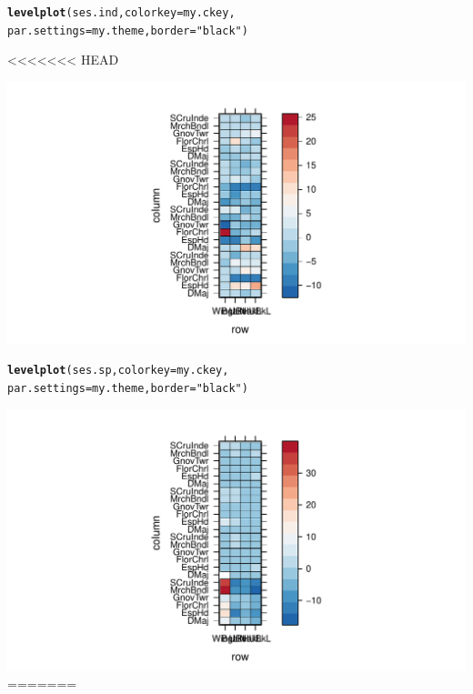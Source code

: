 \documentclass[12pt]{article}\usepackage[]{graphicx}\usepackage[]{color}
\makeatletter
\def\maxwidth{ %
  \ifdim\Gin@nat@width>\linewidth
    \linewidth
  \else
    \Gin@nat@width
  \fi
}
\newcommand{\hlstr}[1]{\textcolor[rgb]{0.192,0.494,0.8}{#1}}%
\newcommand{\hlstd}[1]{\textcolor[rgb]{0.345,0.345,0.345}{#1}}%
\newcommand{\hlkwc}[1]{\textcolor[rgb]{0.333,0.667,0.333}{#1}}%
\newcommand{\hlkwd}[1]{\textcolor[rgb]{0.737,0.353,0.396}{\textbf{#1}}}%
\newenvironment{kframe}{%
 \def\at@end@of@kframe{}%
 \ifinner\ifhmode%
  \def\at@end@of@kframe{\end{minipage}}%
  \begin{minipage}{\columnwidth}%
 \fi\fi%
 \def\FrameCommand##1{\hskip\@totalleftmargin \hskip-\fboxsep
 \colorbox{shadecolor}{##1}\hskip-\fboxsep
     \hskip-\linewidth \hskip-\@totalleftmargin \hskip\columnwidth}%
 \MakeFramed {\advance\hsize-\width
   \@totalleftmargin\z@ \linewidth\hsize
   \@setminipage}}%
 {\par\unskip\endMakeFramed%
 \at@end@of@kframe}
\newenvironment{knitrout}{}{} %
\makeatother
\begin{document}
\begin{knitrout}
\begin{kframe}
{\ttfamily\noindent\bfseries\color{errorcolor}{\#\# Error: erreur d'évaluation de l'argument 'x' lors de la sélection d'une méthode pour la fonction 't' : Erreur dans rbind(ses.list[[5]]\$ses, ses.list[[6]]\$ses, ses.list[[7]]\$ses,\ \ : \\\#\#\ \  objet 'ses.list' introuvable}}\begin{alltt}
\hlkwd{levelplot}\hlstd{(ses.ind,} \hlkwc{colorkey} \hlstd{= my.ckey,}
     \hlkwc{par.settings} \hlstd{= my.theme,}\hlkwc{border} \hlstd{=} \hlstr{"black"}\hlstd{)}
\end{alltt}
<<<<<<< HEAD
\end{kframe}
\includegraphics[width=\maxwidth]{figure/unnamed-chunk-661} 
\begin{kframe}\begin{alltt}
\hlkwd{levelplot}\hlstd{(ses.sp,} \hlkwc{colorkey} \hlstd{= my.ckey,}
     \hlkwc{par.settings} \hlstd{= my.theme,}\hlkwc{border} \hlstd{=} \hlstr{"black"}\hlstd{)}
\end{alltt}
\end{kframe}
\includegraphics[width=\maxwidth]{figure/unnamed-chunk-662} 
=======



\end{knitrout}
\end{document}
